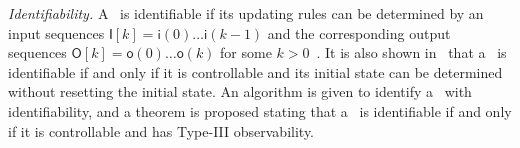 
\smallskip\noindent
{\em Identifiability.} A \BCN\  is identifiable if its  updating rules can be determined by an input sequences $\mathsf{I}[k]=\mathsf{i}(0)\ldots\mathsf{i}(k-1)$ and the corresponding output sequences $\mathsf{O}[k]=\mathsf{o}(0)\ldots\mathsf{o}(k)$ for some $k>0$~\cite{Cheng2011Identification}. It is also shown in~\cite{Cheng2011Identification} that a \BCN\  is identifiable if and only if it is controllable and  its initial state can be determined without resetting the initial state. An algorithm is given  to identify a  \BCN\  with identifiability, and a theorem is proposed stating that a  \BCN\ is identifiable if and only if it is controllable and has {\sf Type-III} observability.
  

